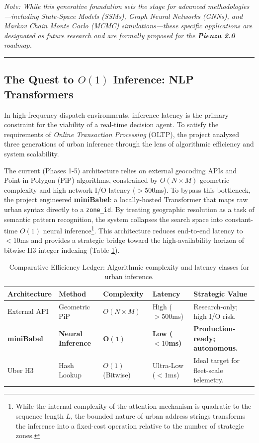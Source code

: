 \noindent \textit{Note: While this generative foundation sets the stage for advanced methodologies---including State-Space Models (SSMs), Graph Neural Networks (GNNs), and Markov Chain Monte Carlo (MCMC) simulations---these specific applications are designated as future research and are formally proposed for the \textbf{Pienza 2.0} roadmap.}

\vspace{0.4cm}
\rule{\linewidth}{0.4pt}

\subsection{The Quest to $O(1)$ Inference: NLP Transformers}
In high-frequency dispatch environments, inference latency is the primary constraint for the viability of a real-time decision agent. To satisfy the requirements of \textit{Online Transaction Processing} (OLTP), the project analyzed three generations of urban inference through the lens of algorithmic efficiency and system scalability.

The current (Phases 1-5) architecture relies on external geocoding APIs and Point-in-Polygon (PiP) algorithms, constrained by $O(N \times M)$ geometric complexity and high network I/O latency ($>500$ms). To bypass this bottleneck, the project engineered \textbf{miniBabel}: a locally-hosted Transformer that maps raw urban syntax directly to a \texttt{zone\_id}. By treating geographic resolution as a task of semantic pattern recognition, the system collapses the search space into constant-time $O(1)$ neural inference\footnote{While the internal complexity of the attention mechanism is quadratic to the sequence length $L$, the bounded nature of urban address strings transforms the inference into a fixed-cost operation relative to the number of strategic zones.}. This architecture reduces end-to-end latency to $<10$ms and provides a strategic bridge toward the high-availability horizon of bitwise H3 integer indexing (Table \ref{tab:babel_efficiency}).

\begin{table}[H]
    \centering
    \small
    \begin{tabularx}{\textwidth}{l l l l X}
        \toprule
        \textbf{Architecture} & \textbf{Method} & \textbf{Complexity} & \textbf{Latency} & \textbf{Strategic Value} \\
        \midrule
        External API & Geometric PiP & $O(N \times M)$ & High ($>500$ms) & Research-only; high I/O risk. \\
        \addlinespace
        \textbf{miniBabel} & \textbf{Neural Inference} & $\mathbf{O(1)}$ & \textbf{Low ($<10$ms)} & \textbf{Production-ready; autonomous.} \\
        \addlinespace
        Uber H3 & Hash Lookup & $O(1)$ (Bitwise) & Ultra-Low ($<1$ms) & Ideal target for fleet-scale telemetry. \\
        \bottomrule
    \end{tabularx}
    \caption{Comparative Efficiency Ledger: Algorithmic complexity and latency classes for urban inference.}
    \label{tab:babel_efficiency}
\end{table}

